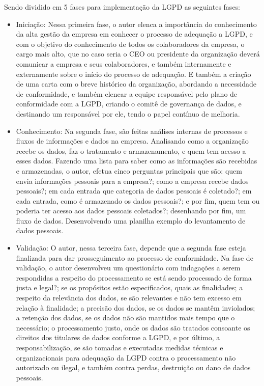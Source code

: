 \documentclass[
	12pt,				%
	openright,			%
	oneside,			%
	a4paper,			%
	english,			%
	french,				%
	spanish,			%
	brazil,				%
	]{abntex2}
\begin{document}
Sendo dividido em 5 fases para implementação da LGPD as seguintes fases: 
\begin{itemize}
\item Iniciação: Nessa primeira fase, o autor elenca a importância do conhecimento da alta gestão da empresa em conhecer o processo de adequação a LGPD, e com o objetivo do conhecimento de todos os colaboradores da empresa, o cargo mais alto, que no caso seria o CEO ou presidente da organização deverá comunicar a empresa e seus colaboradores, e também internamente e externamente sobre o início do processo de adequação. E também a criação de uma carta com o breve histórico da organização, abordando a necessidade de conformidade, e também elencar a equipe responsável pelo plano de conformidade com a LGPD, criando o comitê de governança de dados, e destinando um responsável por ele, tendo o papel contínuo de melhoria.
\item  Conhecimento: Na segunda fase, são feitas análises internas de processos e fluxos de informações e dados na empresa. Analisando como a organização recebe os dados, faz o tratamento e armazenamento, e quem tem acesso a esses dados. Fazendo uma lista para saber como as informações são recebidas e armazenadas, o autor, efetua cinco perguntas principais que são: quem envia informações pessoais para a empresa?; como a empresa recebe dados pessoais?; em cada entrada que categoria de dados pessoais é coletado?; em cada entrada, como é armazenado os dados pessoais?; e por fim, quem tem ou poderia ter acesso aos dados pessoais coletados?; desenhando por fim, um fluxo de dados. Desenvolvendo uma planilha exemplo do levantamento de dados pessoais.
\item Validação: O autor, nessa terceira fase, depende que a segunda fase esteja finalizada para dar prosseguimento ao processo de conformidade. Na fase de validação, o autor desenvolveu um questionário com indagações a serem respondidas a respeito do processamento se está sendo processado de forma justa e legal?; se os propósitos estão especificados, quais as finalidades; a respeito da relevância dos dados, se são relevantes e não tem excesso em relação à finalidade; a precisão dos dados, se os dados se mantêm inviolados; a retenção dos dados, se os dados não são mantidos mais tempo que o necessário; o processamento justo, onde os dados são tratados consoante os direitos dos titulares de dados conforme a LGPD, e por último, a responsabilização, se são tomadas e executadas medidas técnicas e organizacionais para adequação da LGPD contra o processamento não autorizado ou ilegal, e também contra perdas, destruição ou dano de dados pessoais.


\end{itemize}
\end{document}

